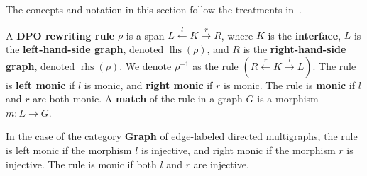  The concepts and notation in this section follow the treatments in~\cite{endrullis2024generalized_icgt}.
\begin{definition}
  \label{def:grs:dpo_rule}
A \textbf{DPO rewriting rule} $\rho$ is a span \( L \overset{l}{\leftarrow} K \overset{r}{\rightarrow} R \), where \( K \) is the \textbf{interface}, \( L \) is the \textbf{left-hand-side graph}, denoted \( \operatorname{lhs}(\rho) \), and \( R \) is the \textbf{right-hand-side graph}, denoted \( \operatorname{rhs}(\rho) \). We denote $\rho^{-1}$ as the rule $(R \overset{r}{\leftarrow} K \overset{l}{\rightarrow} L)$. The rule is \textbf{left monic} if \( l \) is monic, and \textbf{right monic} if \( r \) is monic. 
The rule is \textbf{monic} if $l$ and $r$ are both monic.
A \textbf{match} of the rule in a graph \( G \) is a morphism \( m: L \rightarrow G \).
\end{definition}
In the case of the category \textbf{Graph} of edge-labeled directed multigraphs, the rule is left monic if the morphism \( l \) is injective, and right monic if the morphism \( r \) is injective. The rule is monic if both \( l \) and \( r \) are injective.

